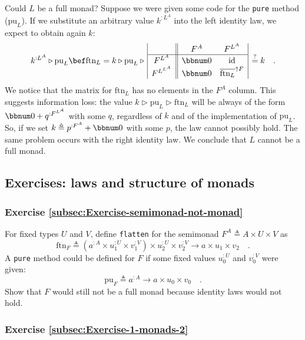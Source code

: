 Could $L$ be a full monad? Suppose we were given some code for the
\lstinline!pure! method ($\text{pu}_{L}$). If we substitute an arbitrary
value $k^{:L^{A}}$ into the left identity law, we expect to obtain
again $k$:
\[
k^{:L^{A}}\triangleright\text{pu}_{L}\bef\text{ftn}_{L}=k\triangleright\text{pu}_{L}\triangleright\,\begin{array}{|c||cc|}
 & F^{A} & F^{L^{A}}\\
\hline F^{L^{A}} & \bbnum 0 & \text{id}\\
F^{L^{L^{A}}} & \bbnum 0 & \overline{\text{ftn}_{L}}^{\uparrow F}
\end{array}\,\overset{?}{=}k\quad.
\]
We notice that the matrix for $\text{ftn}_{L}$ has no elements in
the $F^{A}$ column. This suggests information loss: the value $k\triangleright\text{pu}_{L}\triangleright\text{ftn}_{L}$
will be always of the form $\bbnum 0+q^{:F^{L^{A}}}$ with some $q$,
regardless of $k$ and of the implementation of $\text{pu}_{L}$.
So, if we set $k\triangleq p^{:F^{A}}+\bbnum 0$ with some $p$, the
law cannot possibly hold. The same problem occurs with the right identity
law. We conclude that $L$ cannot be a full monad.

\subsection{Exercises: laws and structure of monads}

\subsubsection{Exercise \label{subsec:Exercise-semimonad-not-monad}\ref{subsec:Exercise-semimonad-not-monad}}

For fixed types $U$ and $V$, define \lstinline!flatten! for the
semimonad $F^{A}\triangleq A\times U\times V$ as
\[
\text{ftn}_{F}\triangleq(a^{:A}\times u_{1}^{:U}\times v_{1}^{:V})\times u_{2}^{:U}\times v_{2}^{:V}\rightarrow a\times u_{1}\times v_{2}\quad.
\]
A \lstinline!pure! method could be defined for $F$ if some fixed
values $u_{0}^{:U}$ and $v_{0}^{:V}$ were given:
\[
\text{pu}_{F}\triangleq a^{:A}\rightarrow a\times u_{0}\times v_{0}\quad.
\]
Show that $F$ would still not be a full monad because identity laws
would not hold.

\subsubsection{Exercise \label{subsec:Exercise-1-monads-2}\ref{subsec:Exercise-1-monads-2}}

